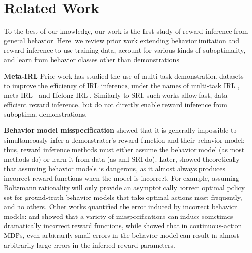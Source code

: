 \section{Related Work}
\label{sec:relatedwork}

To the best of our knowledge, our work is the first study of reward inference from general behavior. 
Here, we review prior work extending behavior imitation \citep{pomerleau1988alvinn} and reward inference \citep{ng2000algorithms} to use training data, account for various kinds of suboptimality, and learn from behavior classes other than demonstrations.







\textbf{Meta-IRL} Prior work has studied the use of multi-task demonstration datasets to improve the efficiency of IRL inference, under the names of multi-task IRL \citep{babes2011apprenticeship, dimitrakakis2012bayesian, choi2012nonparametric, gleave2018multitask}, meta-IRL \citep{xu2019learning, yu2019meta, ghasemipour2019smile, wang2021meta}, and lifelong IRL \citep{mendez2018lifelong}. Similarly to SRI, such works allow fast, data-efficient reward inference, but do not directly enable reward inference from suboptimal demonstrations.






\textbf{Behavior model misspecification} \citet{armstrong2018occam} showed that it is generally impossible to simultaneously infer a demonstrator's reward function and their behavior model; thus, reward inference methods must either assume the behavior model (as most methods do) or learn it from data (as \citet{shah2019feasibility} and SRI do). Later, \citet{Skalse2022MisspecificationII} showed theoretically that assuming behavior models is dangerous, as it almost always produces incorrect reward functions when the model is incorrect. For example, assuming Boltzmann rationality will only provide an asymptotically correct optimal policy set for ground-truth behavior models that take optimal actions most frequently, and no others.
Other works quantified the error induced by incorrect behavior models: \citet{shah2019feasibility} and \citet{chan2021human} showed that a variety of misspecifications can induce sometimes dramatically incorrect reward functions, while \citet{hong2023sensitivity} showed that in continuous-action MDPs, even arbitrarily small errors in the behavior model can result in almost arbitrarily large errors in the inferred reward parameters.



